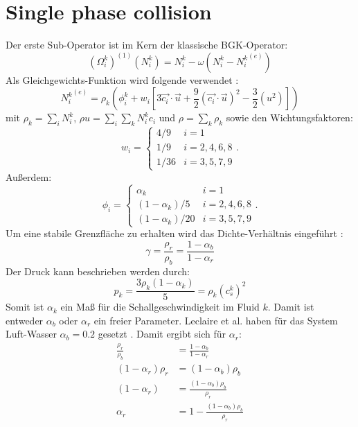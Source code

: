 \documentclass[a4paper,10pt]{scrreprt}
\begin{document}
\section{Single phase collision}
Der erste Sub-Operator ist im Kern der klassische BGK-Operator:
\begin{equation}
 (\Omega_i^k)^{(1)} (N_i^k) = N_i^k - \omega \left(N_i^k - {N_i^k}^{(e)} \right)
\end{equation}
Als Gleichgewichts-Funktion wird folgende verwendet \cite{Reis2007}:
\begin{equation}
\label{eq:equilibrium}
 {N_i^k}^{(e)} = \rho_k \left( \phi_i^k + w_i \left[3 \vec{c_i} \cdot \vec{u} + \frac{9}{2} (\vec{c_i} \cdot \vec{u})^2 - \frac{3}{2} (u^2) \right]  \right)
\end{equation}
mit $\rho_k = \sum_i N_i^k$, $ \rho u = \sum_i \sum_k N_i^k c_i$ und $\rho = \sum_k \rho_k$ sowie den Wichtungsfaktoren:
\begin{equation}
 w_i = \left\lbrace \begin{array}{ll} 4/9 &i = 1 \\ 1/9 & i= 2,4,6,8 \\ 1/36 & i = 3,5,7,9  \end{array}     \right. .
\end{equation}
Außerdem:
\begin{equation}
 \phi_i = \left\lbrace \begin{array}{ll} \alpha_k &i = 1 \\ (1-\alpha_k)/5 & i= 2,4,6,8 \\ (1-\alpha_k)/20 & i = 3,5,7,9  \end{array}     \right. .
\end{equation}
Um eine stabile Grenzfläche zu erhalten wird das Dichte-Verhältnis eingeführt \cite{Grunau1993,Reis2007,Leclaire2011}:
\begin{equation}
 \gamma = \frac{\rho_r}{\rho_b} = \frac{1 - \alpha_b}{1 - \alpha_r}
\end{equation}
Der Druck kann beschrieben werden durch:
\begin{equation}
 p_k = \frac{3 \rho_k (1- \alpha_k)}{5}= \rho_k (c_s^k)^2
\end{equation}
Somit ist $\alpha_k$ ein Maß für die Schallgeschwindigkeit im Fluid $k$. Damit ist entweder $\alpha_b$ oder $\alpha_r$ ein freier Parameter.
Leclaire et al. haben für das System Luft-Wasser $\alpha_b = \num{0.2}$ gesetzt \cite{Leclaire2011}. Damit ergibt sich für $\alpha_r$:
\begin{align}
 \frac{\rho_r}{\rho_b} &= \frac{1 - \alpha_b}{1 - \alpha_r} \\
(1 - \alpha_r) \rho_r & =  (1 - \alpha_b) \rho_b \\
(1 - \alpha_r) &= \frac{ (1 - \alpha_b) \rho_b}{\rho_r} \\
\alpha_r &= 1 - \frac{ (1 - \alpha_b) \rho_b}{\rho_r}
\end{align}
\end{document}
